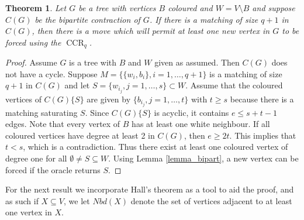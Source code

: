 \documentclass[3p,times,12pt]{article}
\newtheorem{theorem}{Theorem}[section]
\DeclareMathOperator{\CCR}{CCR}
\begin{document}
\begin{theorem}\label{thm_sufficient}
  Let $G$ be a tree with vertices $B$ coloured and $W=V\setminus B$ and suppose $C(G)$ be the bipartite contraction of $G$. If there is a matching of size $q+1$ in $C(G)$, then there is a move which will permit at least one new vertex in $G$ to be forced using the  $\CCR_{q}$.
  \end{theorem}
  \begin{proof}
   Assume $G$ is a tree with $B$ and $W$ given as assumed. Then $C(G)$ does not have a cycle. Suppose $M = \{\{w_i,b_i\}, i=1,\ldots,q+1\}$ is a matching of size $q+1$ in $C(G)$ and let $S = \{w_{i_j}, j=1,\ldots,s\} \subset W$.  Assume that the coloured vertices of $C(G)\{S\}$ are given by $\{b_{i_j}, j=1, \ldots, t\}$ with $t \geq s$ because there is a matching saturating $S$.  Since $C(G)\{S\}$ is acyclic, it contains $e \leq  s+t-1$ edges.  Note that every vertex of $B$ has at least one white neighbour. If all coloured vertices have degree at least 2 in $C(G)$, then $e \geq 2t$.  This implies that $t < s$, which is a contradiction.  
Thus there exist at least one coloured vertex of degree one for all $\emptyset \neq S \subseteq W$. Using Lemma \ref{lemma_bipart}, a new vertex can be forced if the oracle returns $S$.
    \end{proof}

For the next result we incorporate Hall's theorem as a tool to aid the proof, and as such if $X \subseteq V$, we let $Nbd(X)$ denote the set of vertices adjacent to at least one vertex in $X$.
\end{document}
